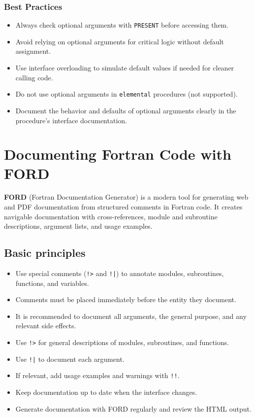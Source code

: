 \documentclass{article}
\begin{document}
\subsubsection{Best Practices}

\begin{itemize}
  \item Always check optional arguments with \texttt{PRESENT} before accessing them.
  \item Avoid relying on optional arguments for critical logic without default assignment.
  \item Use interface overloading to simulate default values if needed for cleaner calling code.
  \item Do not use optional arguments in \texttt{elemental} procedures (not supported).
  \item Document the behavior and defaults of optional arguments clearly in the procedure's interface documentation.
\end{itemize}

\section{Documenting Fortran Code with FORD}

\textbf{FORD} (Fortran Documentation Generator) is a modern tool for generating web and PDF documentation from structured comments in Fortran code. It creates navigable documentation with cross-references, module and subroutine descriptions, argument lists, and usage examples.

\subsection{Basic principles}
\begin{itemize}
  \item Use special comments (\texttt{!>} and \texttt{!|}) to annotate modules, subroutines, functions, and variables.
  \item Comments must be placed immediately before the entity they document.
  \item It is recommended to document all arguments, the general purpose, and any relevant side effects.
\end{itemize}
\begin{itemize}
  \item Use \texttt{!>} for general descriptions of modules, subroutines, and functions.
  \item Use \texttt{!|} to document each argument.
  \item If relevant, add usage examples and warnings with \texttt{!!}.
  \item Keep documentation up to date when the interface changes.
  \item Generate documentation with FORD regularly and review the HTML output.
\end{itemize}
\end{document}
